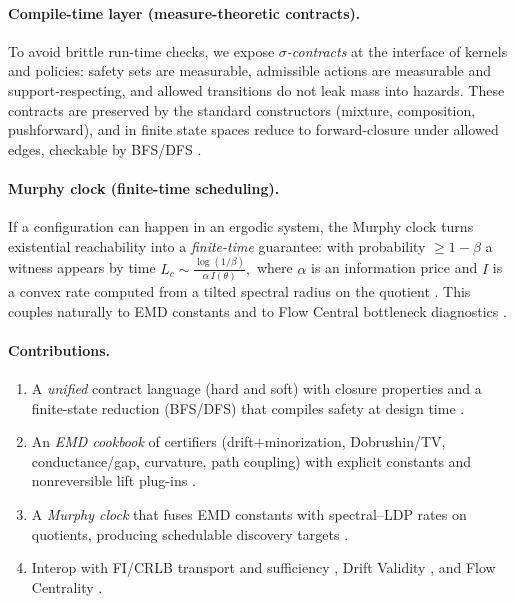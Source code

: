 \documentclass[11pt]{article}
\newcommand{\1}{\mathbbm{1}}
\begin{document}
\paragraph{Compile-time layer (measure-theoretic contracts).}
To avoid brittle run-time checks, we expose \emph{$\sigma$-contracts} at the interface of kernels and policies: safety sets are measurable, admissible actions are measurable and support-respecting, and allowed transitions do not leak mass into hazards. These contracts are preserved by the standard constructors (mixture, composition, pushforward), and in finite state spaces reduce to forward-closure under allowed edges, checkable by BFS/DFS \parencite{Bogachev2007,AliprantisBorder2006,Cormen2009}.

\paragraph{Murphy clock (finite-time scheduling).}
If a configuration can happen in an ergodic system, the Murphy clock turns existential reachability into a \emph{finite-time} guarantee: with probability $\ge 1-\beta$ a witness appears by time
\(
L_c\sim \frac{\log(1/\beta)}{\alpha\,I(\theta)},
\)
where $\alpha$ is an information price and $I$ is a convex rate computed from a tilted spectral radius on the quotient \parencite{DemboZeitouni1998,elliott2025qfi,elliott2025pmb}. This couples naturally to EMD constants and to Flow Central bottleneck diagnostics \parencite{elliott2025flow,Freeman1977,Newman2005}.

\paragraph{Contributions.}
\begin{enumerate}[leftmargin=1.25em]
\item A \emph{unified} contract language (hard and soft) with closure properties and a finite-state reduction (BFS/DFS) that compiles safety at design time \parencite{Bogachev2007,AliprantisBorder2006,Cormen2009}.
\item An \emph{EMD cookbook} of certifiers (drift+minorization, Dobrushin/TV, conductance/gap, curvature, path coupling) with explicit constants and nonreversible lift plug-ins \parencite{MeynTweedie2009,LevinPeresWilmer2009,Seneta2006,Ollivier2009,JoulinOllivier2010,LawlerSokal1988,BubleyDyer1997,ChenLovaszPak1999,DiaconisHolmesNeal2000}.
\item A \emph{Murphy clock} that fuses EMD constants with spectral–LDP rates on quotients, producing schedulable discovery targets \parencite{DemboZeitouni1998,elliott2025qfi,elliott2025pmb}.
\item Interop with FI/CRLB transport and sufficiency \parencite{Blackwell1953,AmariNagaoka2000,Cencov1982}, Drift Validity \parencite{elliott2025drift}, and Flow Centrality \parencite{elliott2025flow}.
\end{enumerate}
\end{document}
